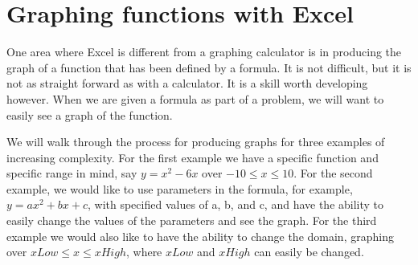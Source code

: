 \documentclass[10pt,]{book}
\theoremstyle{plain}
\theoremstyle{definition}
\theoremstyle{definition}
\begin{document}
\section[{Graphing functions with Excel}]{Graphing functions with Excel}\label{sec-1-4-GraphingFunctionsExcel}

One area where Excel is different from a graphing calculator is in producing the graph of a function that has been defined by a formula.  It is not difficult, but it is not as straight forward as with a calculator. It is a skill worth developing however.  When we are given a formula as part of a problem, we will want to easily see a graph of the function. %
\par

We will walk through the process for producing graphs for three examples of increasing complexity.  For the first example we have a specific function and specific range in mind, say \(y=x^2-6 x\) over \(-10 \le x \le 10\).  For the second example, we would like to use parameters in the formula, for example, \(y = a x^2 + b x + c\), with specified values of a, b, and c, and have the ability to easily change the values of the parameters and see the graph.  For the third example we would also like to have the ability to change the domain, graphing over \(xLow \le x \le xHigh\), where \(xLow\) and \(xHigh\) can easily be changed.%
\end{document}
